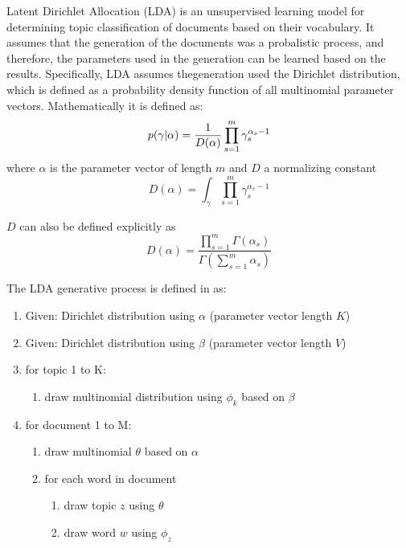 \documentclass[10pt]{article}
\begin{document}
Latent Dirichlet Allocation (LDA) is an unsupervised learning model for determining topic classification of documents based on their vocabulary. It assumes that the generation of the documents was a probalistic process, and therefore, the parameters used in the generation can be learned based on the results. Specifically, LDA assumes thegeneration used the Dirichlet distribution, which is defined as a probability density function of all multinomial parameter vectors. Mathematically it is defined as:
\begin{equation}
    p(\gamma | \alpha) = \frac{1}{D(\alpha)} \prod_{s=1}^{m} \gamma_{s}^{\alpha_s - 1} \\
\end{equation}
where $\alpha$ is the parameter vector of length $m$ and $D$ a normalizing constant
\begin{equation}
    D(\alpha) = \int_{\gamma} \prod_{s=1}^m \gamma_s^{\alpha_s - 1}
\end{equation}

$D$ can also be defined explicitly as
\begin{equation}
    D(\alpha) = \frac{\prod_{s=1}^m \Gamma(\alpha_s)}{\Gamma (\sum_{s=1}^m \alpha_s )}
\end{equation}

The LDA generative process is defined in \cite{CSE250B} as:
\begin{enumerate}
    \item Given: Dirichlet distribution using $\alpha$ (parameter vector length $K$)
    \item Given: Dirichlet distribution using $\beta$ (parameter vector length $V$)
    \item for topic 1 to K:
        \begin{enumerate}
            \item draw multinomial distribution using $\phi_k$ based on $\beta$
        \end{enumerate}
    \item for document 1 to M:
        \begin{enumerate}
            \item draw multinomial $\theta$ based on $\alpha$
            \item for each word in document
                \begin{enumerate}
                    \item draw topic $z$ using $\theta$
                    \item draw word $w$ using $\phi_z$
                \end{enumerate}
        \end{enumerate}
\end{enumerate}
\end{document}
